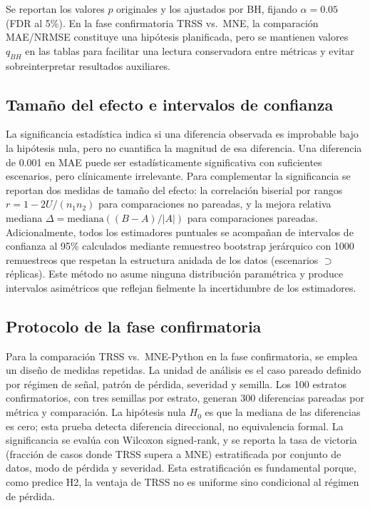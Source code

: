 Se reportan los valores $p$ originales y los ajustados por BH, fijando $\alpha = 0.05$ (FDR al 5\%). En la fase confirmatoria TRSS vs.\ MNE, la comparación MAE/NRMSE constituye una hipótesis planificada, pero se mantienen valores $q_{BH}$ en las tablas para facilitar una lectura conservadora entre métricas y evitar sobreinterpretar resultados auxiliares.

\subsection{Tamaño del efecto e intervalos de confianza}

La significancia estadística indica si una diferencia observada es improbable bajo la hipótesis nula, pero no cuantifica la magnitud de esa diferencia. Una diferencia de 0.001 en MAE puede ser estadísticamente significativa con suficientes escenarios, pero clínicamente irrelevante. Para complementar la significancia se reportan dos medidas de tamaño del efecto: la correlación biserial por rangos $r = 1 - 2U/(n_1 n_2)$ para comparaciones no pareadas, y la mejora relativa mediana $\Delta = \text{mediana}((B-A)/|A|)$ para comparaciones pareadas. Adicionalmente, todos los estimadores puntuales se acompañan de intervalos de confianza al 95\% calculados mediante remuestreo bootstrap jerárquico con 1000 remuestreos que respetan la estructura anidada de los datos (escenarios $\supset$ réplicas). Este método no asume ninguna distribución paramétrica y produce intervalos asimétricos que reflejan fielmente la incertidumbre de los estimadores.

\subsection{Protocolo de la fase confirmatoria}

Para la comparación TRSS vs.\ MNE-Python en la fase confirmatoria, se emplea un diseño de medidas repetidas. La unidad de análisis es el caso pareado definido por régimen de señal, patrón de pérdida, severidad y semilla. Los 100 estratos confirmatorios, con tres semillas por estrato, generan 300 diferencias pareadas por métrica y comparación. La hipótesis nula $H_0$ es que la mediana de las diferencias es cero; esta prueba detecta diferencia direccional, no equivalencia formal. La significancia se evalúa con Wilcoxon signed-rank, y se reporta la tasa de victoria (fracción de casos donde TRSS supera a MNE) estratificada por conjunto de datos, modo de pérdida y severidad. Esta estratificación es fundamental porque, como predice H2, la ventaja de TRSS no es uniforme sino condicional al régimen de pérdida.


